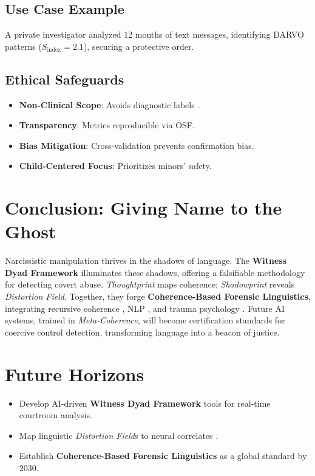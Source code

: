 \documentclass[11pt]{article}
\newcommand{\thoughtprint}{\textit{Thoughtprint}}
\newcommand{\shadowprint}{\textit{Shadowprint}}
\newcommand{\witnessdyad}{\textbf{Witness Dyad Framework}}
\newcommand{\metacoherence}{\textit{Meta-Coherence}}
\newcommand{\distortionfield}{\textit{Distortion Field}}
\begin{document}
\subsection{Use Case Example}
A private investigator analyzed 12 months of text messages, identifying DARVO patterns (\(S_{\text{index}} = 2.1\)), securing a protective order.

\subsection{Ethical Safeguards}
\begin{itemize}
    \item \textbf{Non-Clinical Scope}: Avoids diagnostic labels \citep{apa2017}.
    \item \textbf{Transparency}: Metrics reproducible via OSF.
    \item \textbf{Bias Mitigation}: Cross-validation prevents confirmation bias.
    \item \textbf{Child-Centered Focus}: Prioritizes minors’ safety.
\end{itemize}

\section{Conclusion: Giving Name to the Ghost}
\label{sec:conclusion}
Narcissistic manipulation thrives in the shadows of language. The \witnessdyad{} illuminates these shadows, offering a falsifiable methodology for detecting covert abuse. \thoughtprint{} maps coherence; \shadowprint{} reveals \distortionfield{}. Together, they forge \textbf{Coherence-Based Forensic Linguistics}, integrating recursive coherence \citep{havens2025a}, NLP \citep{devlin2019}, and trauma psychology \citep{herman1992}. Future AI systems, trained in \metacoherence{}, will become certification standards for coercive control detection, transforming language into a beacon of justice.

\section{Future Horizons}
\label{sec:horizons}
\begin{itemize}
    \item Develop AI-driven \witnessdyad{} tools for real-time courtroom analysis.
    \item Map linguistic \distortionfield{}s to neural correlates \citep{ekman2003}.
    \item Establish \textbf{Coherence-Based Forensic Linguistics} as a global standard by 2030.
\end{itemize}
\end{document}
